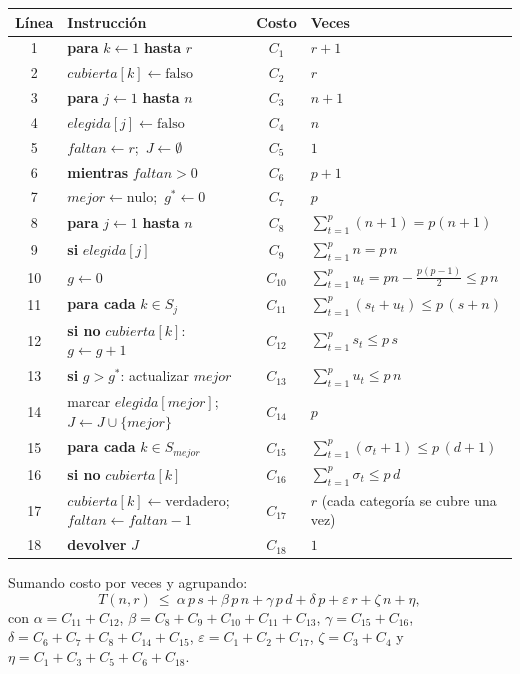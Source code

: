 \documentclass[11pt,a4paper]{article}
\theoremstyle{definition}
\begin{document}
\begin{center}
\small
\begin{tabular}{@{}clcl@{}}
\toprule
Línea & Instrucción & Costo & Veces\\
\midrule
1 & \textbf{para} $k\gets 1$ \textbf{hasta} $r$ & $C_1$ & $r+1$\\
2 & $cubierta[k]\gets\text{falso}$ & $C_2$ & $r$\\
3 & \textbf{para} $j\gets 1$ \textbf{hasta} $n$ & $C_3$ & $n+1$\\
4 & $elegida[j]\gets\text{falso}$ & $C_4$ & $n$\\
5 & $faltan\gets r$;\ $J\gets\emptyset$ & $C_5$ & $1$\\
6 & \textbf{mientras} $faltan>0$ & $C_6$ & $p+1$\\
7 & $mejor\gets\text{nulo}$;\ $g^*\gets 0$ & $C_7$ & $p$\\
8 & \textbf{para} $j\gets 1$ \textbf{hasta} $n$ & $C_8$ & $\sum_{t=1}^{p}(n+1)=p(n+1)$\\
9 & \textbf{si} $elegida[j]$ & $C_9$ & $\sum_{t=1}^{p}n=p\,n$\\
10 & $g\gets 0$ & $C_{10}$ & $\sum_{t=1}^{p}u_t=pn-\tfrac{p(p-1)}{2}\le p\,n$\\
11 & \textbf{para cada} $k\in S_j$ & $C_{11}$ & $\sum_{t=1}^{p}(s_t+u_t)\le p\,(s+n)$\\
12 & \textbf{si no} $cubierta[k]$: $g\gets g+1$ & $C_{12}$ & $\sum_{t=1}^{p}s_t\le p\,s$\\
13 & \textbf{si} $g>g^*$: actualizar $mejor$ & $C_{13}$ & $\sum_{t=1}^{p}u_t\le p\,n$\\
14 & marcar $elegida[mejor]$; $J\gets J\cup\{mejor\}$ & $C_{14}$ & $p$\\
15 & \textbf{para cada} $k\in S_{mejor}$ & $C_{15}$ & $\sum_{t=1}^{p}(\sigma_t+1)\le p\,(d+1)$\\
16 & \textbf{si no} $cubierta[k]$ & $C_{16}$ & $\sum_{t=1}^{p}\sigma_t\le p\,d$\\
17 & $cubierta[k]\gets\text{verdadero}$;\ $faltan\gets faltan-1$ & $C_{17}$ & $r$ (cada categoría se cubre una vez)\\
18 & \textbf{devolver} $J$ & $C_{18}$ & $1$\\
\bottomrule
\end{tabular}
\end{center}

Sumando costo por veces y agrupando:
\[
T(n,r)\ \le\ \alpha\,p\,s+\beta\,p\,n+\gamma\,p\,d+\delta\,p+\varepsilon\,r+\zeta\,n+\eta,
\]
con $\alpha=C_{11}+C_{12}$, $\beta=C_8+C_9+C_{10}+C_{11}+C_{13}$, $\gamma=C_{15}+C_{16}$, $\delta=C_6+C_7+C_8+C_{14}+C_{15}$, $\varepsilon=C_1+C_2+C_{17}$, $\zeta=C_3+C_4$ y $\eta=C_1+C_3+C_5+C_6+C_{18}$.
\end{document}

